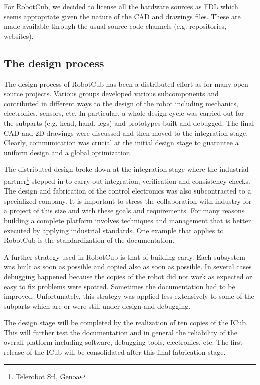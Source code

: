 For RobotCub, we decided to license all the hardware sources as FDL which seems
appropriate given the nature of the CAD and drawings files. These are made 
available through the usual source code channels (e.g. repositories, websites).

\subsection{The design process}
The design process of RobotCub has been a distributed effort as for many open
source projects. Various groups developed various subcomponents and contributed in
different ways to the design of the robot including mechanics, electronics, sensors, 
etc. In particular, a whole design cycle was carried out for the subparts (e.g.
head, hand, legs) and prototypes built and debugged. The final CAD and 2D drawings 
were discussed and then moved to the integration stage. Clearly, communication
was crucial at the initial design stage to guarantee a uniform design and a
global optimization.

The distributed design broke down at the integration stage where the industrial 
partner\footnote{Telerobot Srl, Genoa} stepped in to carry out integration, 
verification and consistency checks. The design and fabrication of the control 
electronics was also subcontracted to a specialized company.
It is important to stress the collaboration with industry for a project of this
size and with these goals and requirements. For many reasons building a complete 
platform involves techniques and management that is better executed by applying 
industrial standards. One example that applies to RobotCub is the standardization 
of the documentation.

A further strategy used in RobotCub is that of building early. Each subsystem
was built as soon as possible and copied also as soon as possible. In several cases
debugging happened because the copies of the robot did not work as expected or
easy to fix problems were spotted. Sometimes the documentation had to be improved.
Unfortunately, this strategy was applied less extensively to some of the subparts 
which are or were still under design and debugging. 

The design stage will be completed by the realization of ten copies of the ICub.
This will further test the documentation and in general the reliability of the
overall platform including software, debugging tools, electronics, etc. The first
release of the ICub will be consolidated after this final fabrication stage.

